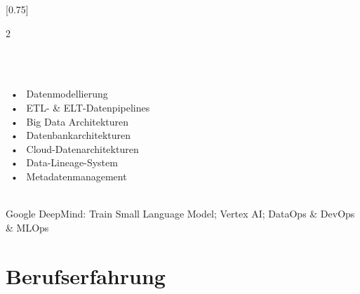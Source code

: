 \documentclass[lighthipster]{simplehipstercv}
\begin{document}
\setlength{\columnsep}{1.5cm}
[0.75]
\begin{paracol}{2}

\paracolbackgroundoptions



\footnotesize
{\setasidefontcolour
\flushright
\begin{center}
\end{center}

\\[0.5em]

{\footnotesize
\lorem}
\bigskip


 \\[0.5em]

~•~ Datenmodellierung \\ ~•~ ETL- \& ELT-Datenpipelines \\ ~•~ Big Data Architekturen \\ ~•~ Datenbankarchitekturen \\ ~•~ Cloud-Datenarchitekturen \\ ~•~ Data-Lineage-System \\ ~•~ Metadatenmanagement


\bigskip


 \\[0.5em]

{\footnotesize Google DeepMind: Train Small Language Model; Vertex AI; DataOps \& DevOps \& MLOps}

\bigskip


\vspace{4em}



\phantom{turn the page}

\phantom{turn the page}
}
\switchcolumn

\small
\section*{Berufserfahrung}


\end{paracol}
\end{document}
